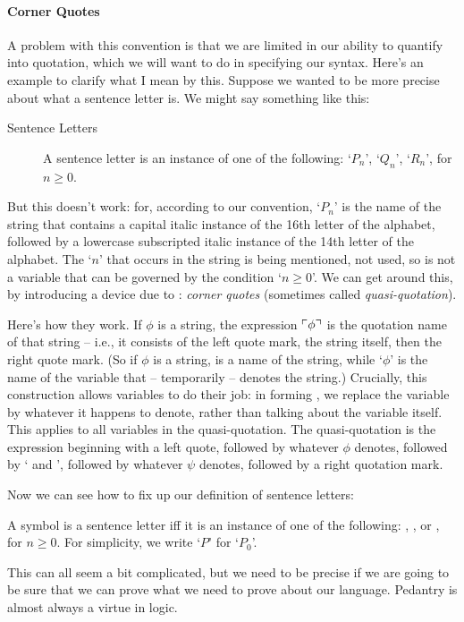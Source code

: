 \paragraph{Corner Quotes} A problem with this convention is that we are limited in our ability to quantify into quotation, which we will want to do in specifying our syntax. Here's an example to clarify what I mean by this. Suppose we wanted to be more precise about what a sentence letter is. We might say something like this: \begin{description} \item[Sentence Letters]
	A sentence letter is an instance of one of the following: `$P_{n}$', `$Q_{n}$', `$R_{n}$', for $n\geqslant 0$. 
\end{description}
But this doesn't work: for, according to our convention, `$P_{n}$' is the name of the string that contains a capital italic instance of the 16th letter of the alphabet, followed by a lowercase subscripted italic instance of the 14th letter of the alphabet. The `$n$' that occurs in the string is being mentioned, not used, so is not a variable that can be governed by the condition `$n\geqslant 0$'. We can get around this, by introducing a device due to \citet[§6]{quine}: \emph{corner quotes} (sometimes called \emph{quasi-quotation}). 

Here's how they work. If $\phi$ is a string, the expression $\ulcorner \phi \urcorner$ is the quotation name of that string – i.e., it consists of the left quote mark, the string itself, then the right quote mark. (So if $\phi$ is a string, \cquote{\phi} is a name of the string, while `$\phi$' is the name of the variable that – temporarily – denotes the string.) Crucially, this construction allows variables to do their job: in forming \cquote{\phi}, we replace the variable by whatever it happens to denote, rather than talking about the variable itself. This applies to all variables in the quasi-quotation. The quasi-quotation  is the expression beginning with a left quote, followed by whatever $\phi$ denotes, followed by ` and ', followed by whatever $\psi$ denotes, followed by a right quotation mark.


Now we can see how to fix up our definition of sentence letters:
\begin{definition}\label{sentlet}
 	A symbol is a sentence letter iff it is an instance of one of the following: , , or , for $n \geqslant 0$. For simplicity, we write `$P$' for `$P_{0}$'. 
 \end{definition}
This can all seem a bit complicated, but we need to be precise if we are going to be sure that we can prove what we need to prove about our language. Pedantry is almost always a virtue in logic.

